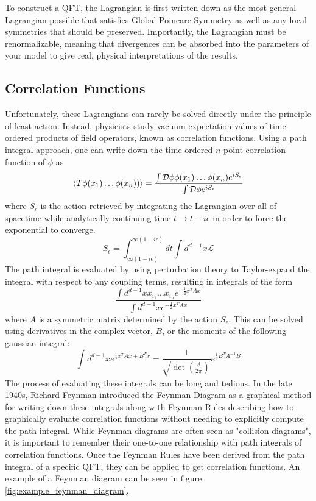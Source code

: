To construct a QFT, the Lagrangian is first written down as the most general Lagrangian possible that satisfies Global Poincare Symmetry as well as any local symmetries that should be preserved. Importantly, the Lagrangian must be renormalizable, meaning that divergences can be absorbed into the parameters of your model to give real, physical interpretations of the results.

\subsection{Correlation Functions}

Unfortunately, these Lagrangians can rarely be solved directly under the principle of least action. Instead, physicists study vacuum expectation values of time-ordered products of field operators, known as correlation functions. Using a path integral approach, one can write down the time ordered $n$-point correlation function of $\phi$ as
\begin{equation}
\braket{T \phi(x_{1}) \dots  \phi({x_{n}}))} = \frac{\int \mathcal{D}\phi \phi(x_{1}) \dots  \phi({x_{n}}) e^{iS_{\epsilon}}}{\int \mathcal{D}\phi e^{iS_{\epsilon}}}
\end{equation}
where $S_\epsilon$ is the action retrieved by integrating the Lagrangian over all of spacetime while analytically continuing time $t \to t - i\epsilon$ in order to force the exponential to converge. 
\begin{equation}
S_{\epsilon} = \int^{\infty(1-i\epsilon)}_{\infty(1-i\epsilon)} dt \int d^{d-1} x \mathcal{L}
\end{equation}
The path integral is evaluated by using perturbation theory to Taylor-expand the integral with respect to any coupling terms, resulting in integrals of the form 
\begin{equation}
\frac{\int d^{d-1}x x_{i_{1}}\dots x_{i_{n}} e^{-\frac{1}{2}x^TAx}}{\int d^{d-1}x  e^{-\frac{1}{2}x^TAx}}
\end{equation}
where $A$ is a symmetric matrix determined by the action $S_\epsilon$. This can be solved using derivatives in the complex vector, $B$, or the moments of the following gaussian integral:
\begin{equation}
\int d^{d-1} x e^{\frac{1}{2}x^TAx + B^Tx} = \frac{1}{\sqrt{ \det\left( \frac{A}{2\pi}\right) } } e^{\frac{1}{2}B^T A^{-1} B}
\end{equation}
The process of evaluating these integrals can be long and tedious. In the late 1940s, Richard Feynman introduced the Feynman Diagram as a graphical method for writing down these integrals along with Feynman Rules describing how to graphically evaluate correlation functions without needing to explicitly compute the path integral. While Feynman diagrams are often seen as "collision diagrams", it is important to remember their one-to-one relationship with path integrals of correlation functions. Once the Feynman Rules have been derived from the path integral of a specific QFT, they can be applied to get correlation functions. An example of a Feynman diagram can be seen in figure \ref{fig:example_feynman_diagram}.

